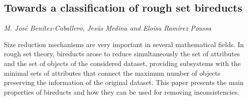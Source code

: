 \documentclass[../booklet.tex]{subfiles}
\begin{document}
\subsection[Towards a classification of rough set bireducts. {\it M. José Benítez-Caballero, Jesús Medina and Eloisa Ramírez Poussa}]{Towards a classification of rough set bireducts}
  

\begin{center}
  {\it M. José Benítez-Caballero, Jesús Medina and Eloisa Ramírez Poussa}
\end{center}



Size reduction mechanisms are very important  in several mathematical fields. In rough set theory, bireducts arose to reduce  simultaneously  the set of attributes and the set of objects of the considered dataset, providing subsystems with the minimal sets of attributes that connect the maximum number of objects preserving the information of the original dataset. This paper   presents the main properties of bireducts and how they can be used  for removing inconsistencies. 
\end{document}
